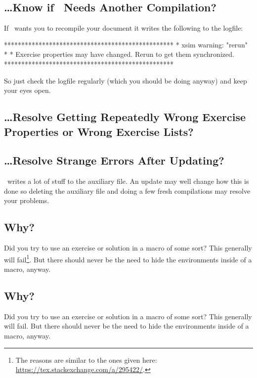 \documentclass{xsim-manual}
\begin{document}
\subsection{\dots Know if \xsim\ Needs Another Compilation?}
If \xsim\ wants you to recompile your document it writes the following to the
logfile:
\begin{sourcecode}
  *************************************************
  * xsim warning: "rerun"
  * 
  * Exercise properties may have changed. Rerun to get them synchronized.
  *************************************************
\end{sourcecode}
So just check the logfile regularly (which you should be doing anyway) and
keep your eyes open.

\subsection{\dots Resolve Getting Repeatedly Wrong Exercise Properties or
  Wrong Exercise Lists?}\label{sec:resolve-getting}
\xsimauxfileinfo

\subsection{\dots Resolve Strange Errors After Updating?}
\xsim\ writes a lot of stuff to the auxiliary file.  An update may well change
how this is done so deleting the auxiliary file and doing a few fresh
compilations may resolve your problems.

\subsection{
  Why?}
Did you try to use an exercise or solution in a macro of some sort?  This
generally will fail\footnote{The reasons are similar to the ones given here:
  \url{https://tex.stackexchange.com/a/295422/}.}.  But there should never be
the need to hide the environments inside of a macro, anyway.

\subsection{ Why?}
Did you try to use an exercise or solution in a macro of some sort?  This
generally will fail.  But there should never be the need to hide the
environments inside of a macro, anyway.
\end{document}
